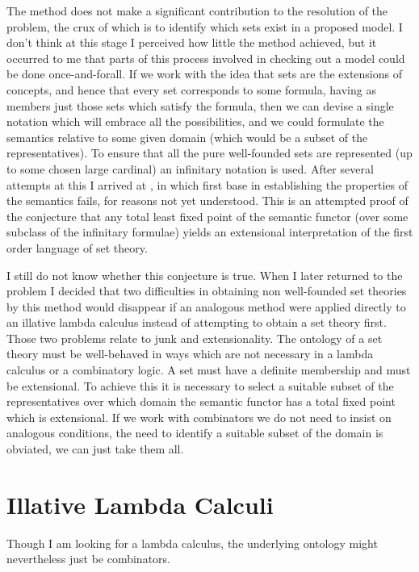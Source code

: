 \documentclass{article}
\begin{document}
\begin{article}
The method does not make a significant contribution to the resolution of the problem, the crux of which is to identify which sets exist in a proposed model.
I don't think at this stage I perceived how little the method achieved, but it occurred to me that parts of this process involved in checking out a model could be done once-and-forall.
If we work with the idea that sets are the extensions of concepts, and hence that every set corresponds to some formula, having as members just those sets which satisfy the formula, then we can devise a single notation which will embrace all the possibilities, and we could formulate the semantics relative to some given domain (which would be a subset of the representatives).
To ensure that all the pure well-founded sets are represented (up to some chosen large cardinal) an infinitary notation is used.
After several attempts at this I arrived at \cite{rbjt026}, in which first base in establishing the properties of the semantics fails, for reasons not yet understood.
This is an attempted proof of the conjecture that any total least fixed point of the semantic functor (over some subclass of the infinitary formulae) yields an extensional interpretation of the first order language of set theory.

I still do not know whether this conjecture is true.
When I later returned to the problem I decided that two difficulties in obtaining non well-founded set theories by this method would disappear if an analogous method were applied directly to an illative lambda calculus instead of attempting to obtain a set theory first.
Those two problems relate to junk and extensionality.
The ontology of a set theory must be well-behaved in ways which are not necessary in a lambda calculus or a combinatory logic.
A set must have a definite membership and must be extensional.
To achieve this it is necessary to select a suitable subset of the representatives over which domain the semantic functor has a total fixed point which is extensional.
If we work with combinators we do not need to insist on analogous conditions, the need to identify a suitable subset of the domain is obviated, we can just take them all.

\section{Illative Lambda Calculi}

Though I am looking for a lambda calculus, the underlying ontology might nevertheless just be combinators.

{\raggedright


} %


\end{article}
\end{document}
